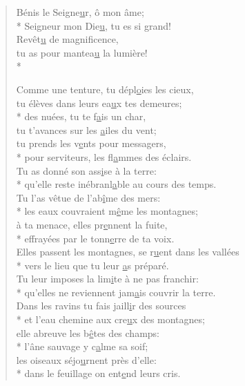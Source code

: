 \begin{verse}
Bénis le Seigne\underline{u}r, ô mon âme; \\*
Seigneur mon Die\underline{u}, tu es si grand! \\
Revêt\underline{u} de magnificence, \\
tu as pour mantea\underline{u} la lumière! \\*

Comme une tenture, tu dépl\underline{o}ies les cieux, \\
tu élèves dans leurs ea\underline{u}x tes demeures; \\*
des nuées, tu te f\underline{a}is un char, \\
tu t’avances sur les \underline{a}iles du vent; \\
tu prends les v\underline{e}nts pour messagers, \\*
pour serviteurs, les fl\underline{a}mmes des éclairs. \\

Tu as donné son ass\underline{i}se à la terre: \\*
qu’elle reste inébranl\underline{a}ble au cours des temps. \\
Tu l’as vêtue de l’ab\underline{î}me des mers: \\*
les eaux couvraient m\underline{ê}me les montagnes; \\
à ta menace, elles pr\underline{e}nnent la fuite, \\*
effrayées par le tonn\underline{e}rre de ta voix. \\

Elles passent les montagnes, se r\underline{u}ent dans les vallées \\*
vers le lieu que tu leur \underline{a}s préparé. \\
Tu leur imposes la lim\underline{i}te à ne pas franchir: \\*
qu’elles ne reviennent jam\underline{a}is couvrir la terre. \\

Dans les ravins tu fais jaill\underline{i}r des sources \\*
et l’eau chemine aux cre\underline{u}x des montagnes; \\
elle abreuve les b\underline{ê}tes des champs: \\*
l’âne sauvage y c\underline{a}lme sa soif; \\
les oiseaux séjo\underline{u}rnent près d’elle: \\*
dans le feuillage on ent\underline{e}nd leurs cris. \\


\end{verse}
